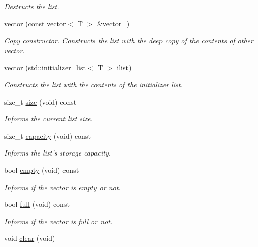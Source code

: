 \begin{DoxyCompactItemize}
\begin{DoxyCompactList}\small\item\em Destructs the list. \end{DoxyCompactList}\item 
\hyperlink{classls_1_1vector_acf68a9a46e2398917f7f87cb6d6ef214}{vector} (const \hyperlink{classls_1_1vector}{vector}$<$ T $>$ \&vector\+\_\+)
\begin{DoxyCompactList}\small\item\em Copy constructor. Constructs the list with the deep copy of the contents of other vector. \end{DoxyCompactList}\item 
\hyperlink{classls_1_1vector_a26daeb7a8d46fd1d4036ede13599e97c}{vector} (std\+::initializer\+\_\+list$<$ T $>$ ilist)
\begin{DoxyCompactList}\small\item\em Constructs the list with the contents of the initializer list. \end{DoxyCompactList}\item 
size\+\_\+t \hyperlink{classls_1_1vector_a4a84ae30c023098a222fd9fac055284f}{size} (void) const 
\begin{DoxyCompactList}\small\item\em Informs the current list size. \end{DoxyCompactList}\item 
size\+\_\+t \hyperlink{classls_1_1vector_a0b17323cda5ab83ead28a6822e55f762}{capacity} (void) const 
\begin{DoxyCompactList}\small\item\em Informs the list’s storage capacity. \end{DoxyCompactList}\item 
bool \hyperlink{classls_1_1vector_a7bcf18bb76c73f49429beb9512fd7f77}{empty} (void) const 
\begin{DoxyCompactList}\small\item\em Informs if the vector is empty or not. \end{DoxyCompactList}\item 
bool \hyperlink{classls_1_1vector_adf628d0c76d7213c7a64d41d30a640c5}{full} (void) const 
\begin{DoxyCompactList}\small\item\em Informs if the vector is full or not. \end{DoxyCompactList}\item 
void \hyperlink{classls_1_1vector_a72d20c72613053a3f4bcf2e8e0a9da71}{clear} (void)\hypertarget{classls_1_1vector_a72d20c72613053a3f4bcf2e8e0a9da71}{}\label{classls_1_1vector_a72d20c72613053a3f4bcf2e8e0a9da71}


\end{DoxyCompactItemize}
